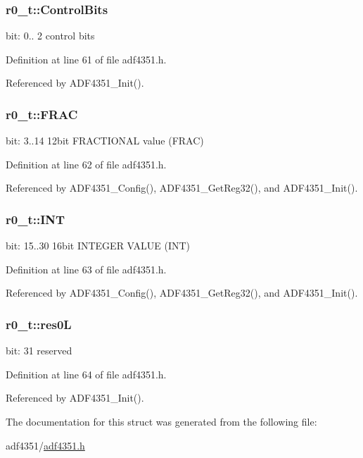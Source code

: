 \subsubsection[{\texorpdfstring{Control\+Bits}{ControlBits}}]{ r0\+\_\+t\+::\+Control\+Bits}\hypertarget{structr0__t_aad2911768ed7dd38e899b81d517dda08}{}\label{structr0__t_aad2911768ed7dd38e899b81d517dda08}
bit\+: 0.. 2 control bits 

Definition at line 61 of file adf4351.\+h.



Referenced by A\+D\+F4351\+\_\+\+Init().

\subsubsection[{\texorpdfstring{F\+R\+AC}{FRAC}}]{ r0\+\_\+t\+::\+F\+R\+AC}\hypertarget{structr0__t_adc22c0b86ef296065f01c8800d4f5d52}{}\label{structr0__t_adc22c0b86ef296065f01c8800d4f5d52}
bit\+: 3..14 12bit F\+R\+A\+C\+T\+I\+O\+N\+AL value (F\+R\+AC) 

Definition at line 62 of file adf4351.\+h.



Referenced by A\+D\+F4351\+\_\+\+Config(), A\+D\+F4351\+\_\+\+Get\+Reg32(), and A\+D\+F4351\+\_\+\+Init().

\subsubsection[{\texorpdfstring{I\+NT}{INT}}]{ r0\+\_\+t\+::\+I\+NT}\hypertarget{structr0__t_a1d7f06769cdf259c9858033cb164e31d}{}\label{structr0__t_a1d7f06769cdf259c9858033cb164e31d}
bit\+: 15..30 16bit I\+N\+T\+E\+G\+ER V\+A\+L\+UE (I\+NT) 

Definition at line 63 of file adf4351.\+h.



Referenced by A\+D\+F4351\+\_\+\+Config(), A\+D\+F4351\+\_\+\+Get\+Reg32(), and A\+D\+F4351\+\_\+\+Init().

\subsubsection[{\texorpdfstring{res0L}{res0L}}]{ r0\+\_\+t\+::res0L}\hypertarget{structr0__t_ab7402e75c2a633ce378078407151341d}{}\label{structr0__t_ab7402e75c2a633ce378078407151341d}
bit\+: 31 reserved 

Definition at line 64 of file adf4351.\+h.



Referenced by A\+D\+F4351\+\_\+\+Init().



The documentation for this struct was generated from the following file\+:\begin{DoxyCompactItemize}
\item 
adf4351/\hyperlink{adf4351_8h}{adf4351.\+h}\end{DoxyCompactItemize}
